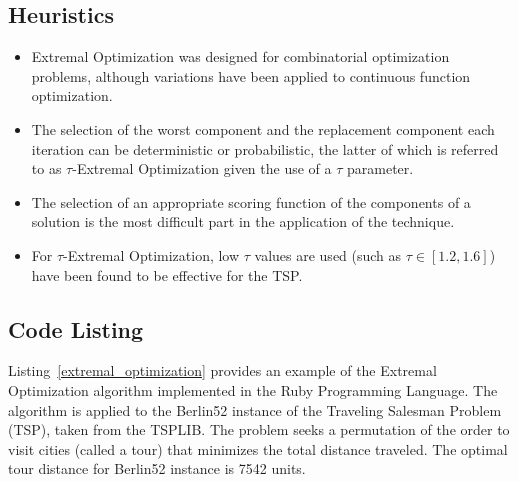 \subsection{Heuristics}
\begin{itemize}
	\item Extremal Optimization was designed for combinatorial optimization problems, although variations have been applied to continuous function optimization.
	\item The selection of the worst component and the replacement component each iteration can be deterministic or probabilistic, the latter of which is referred to as $\tau$-Extremal Optimization given the use of a $\tau$ parameter.
	\item The selection of an appropriate scoring function of the components of a solution is the most difficult part in the application of the technique.
	\item For $\tau$-Extremal Optimization, low $\tau$ values are used (such as $\tau \in [1.2,1.6]$) have been found to be effective for the TSP.
\end{itemize}

\subsection{Code Listing}
Listing~\ref{extremal_optimization} provides an example of the Extremal Optimization algorithm implemented in the Ruby Programming Language. 
The algorithm is applied to the Berlin52 instance of the Traveling Salesman Problem (TSP), taken from the TSPLIB. The problem seeks a permutation of the order to visit cities (called a tour) that minimizes the total distance traveled. The optimal tour distance for Berlin52 instance is 7542 units.

